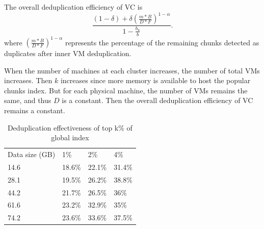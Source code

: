 The overall deduplication efficiency of VC is
\[
\frac{ (1-\delta) + \delta (\frac{m*B}{D*F})^{1-\alpha}}
{ 1- \frac{b_u}{b} }.
\]
where $(\frac{m*B}{D*F})^{1-\alpha}$ represents the percentage of the remaining chunks detected as duplicates
after inner VM deduplication. 

When the number of machines at each cluster increases, the number of total VMs increases.
Then $k$ increases since more memory is available to host the popular chunks index.
But for each physical machine, the number of VMs remains the same, and thus
$D$ is  a constant. Then  the overall deduplication efficiency of VC remains
a constant.







\begin{table}
    \begin{tabular}{llll}
    Data size (GB) & 1\%    & 2\%    & 4\%    \\
    14.6           & 18.6\% & 22.1\% & 31.4\% \\
    28.1           & 19.5\% & 26.2\% & 38.8\% \\
    44.2           & 21.7\% & 26.5\% & 36\%   \\
    61.6           & 23.2\% & 32.9\% & 35\%   \\
    74.2           & 23.6\% & 33.6\% & 37.5\% \\
    \end{tabular}
    \caption{Deduplication effectiveness of top k\% of global index}
    \label{tab:cds}
\end{table}


